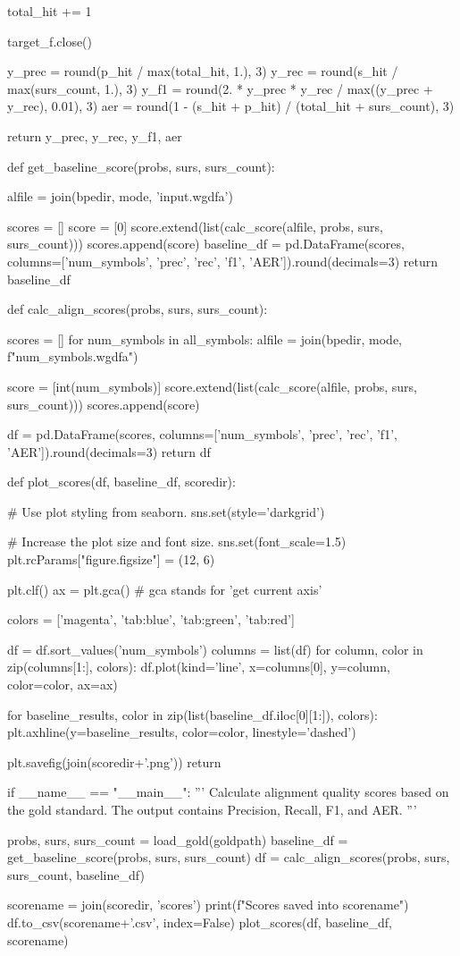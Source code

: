 \begin{python}
      total_hit += 1

  target_f.close()

  y_prec = round(p_hit / max(total_hit, 1.), 3)
  y_rec = round(s_hit / max(surs_count, 1.), 3)
  y_f1 = round(2. * y_prec * y_rec / max((y_prec + y_rec), 0.01), 3)
  aer = round(1 - (s_hit + p_hit) / (total_hit + surs_count), 3)

  return y_prec, y_rec, y_f1, aer

def get_baseline_score(probs, surs, surs_count):

  alfile = join(bpedir, mode, 'input.wgdfa')

  scores = []
  score = [0]
  score.extend(list(calc_score(alfile, probs, surs, surs_count)))
  scores.append(score)
  baseline_df = pd.DataFrame(scores, columns=['num_symbols', 'prec', 'rec', 'f1', 'AER']).round(decimals=3)
  return baseline_df

def calc_align_scores(probs, surs, surs_count):

  scores = []
  for num_symbols in all_symbols:
    alfile = join(bpedir, mode, f"{num_symbols}.wgdfa")
    
    score = [int(num_symbols)]
    score.extend(list(calc_score(alfile, probs, surs, surs_count)))
    scores.append(score)

  df = pd.DataFrame(scores, columns=['num_symbols', 'prec', 'rec', 'f1', 'AER']).round(decimals=3)
  return df


def plot_scores(df, baseline_df, scoredir):

  # Use plot styling from seaborn.
  sns.set(style='darkgrid')

  # Increase the plot size and font size.
  sns.set(font_scale=1.5)
  plt.rcParams["figure.figsize"] = (12, 6)

  plt.clf()
  ax = plt.gca() # gca stands for 'get current axis'

  colors = ['magenta', 'tab:blue', 'tab:green', 'tab:red']

  df = df.sort_values('num_symbols')
  columns = list(df)
  for column, color in zip(columns[1:], colors):
    df.plot(kind='line', x=columns[0], y=column, color=color, ax=ax)

  for baseline_results, color in zip(list(baseline_df.iloc[0][1:]), colors):
    plt.axhline(y=baseline_results, color=color, linestyle='dashed')

  plt.savefig(join(scoredir+'.png'))
  return


if __name__ == "__main__":
  '''
  Calculate alignment quality scores based on the gold standard.
  The output contains Precision, Recall, F1, and AER.
  '''

  probs, surs, surs_count = load_gold(goldpath)
  baseline_df = get_baseline_score(probs, surs, surs_count)
  df = calc_align_scores(probs, surs, surs_count, baseline_df)

  scorename = join(scoredir, 'scores')
  print(f"Scores saved into {scorename}")
  df.to_csv(scorename+'.csv', index=False)
  plot_scores(df, baseline_df, scorename)

\end{python}

